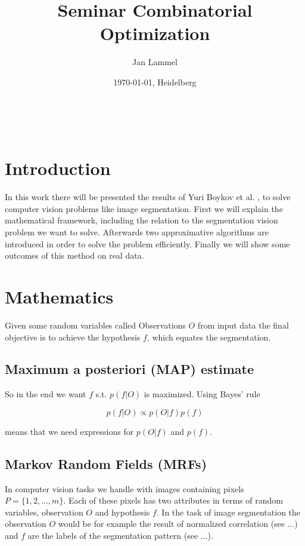 \documentclass{scrartcl}[12pt, halfparskip]
\title{Seminar Combinatorial Optimization}
\author{Jan Lammel}
\date{\today{}, Heidelberg}
\begin{document}
\maketitle \ \\ 
\newpage


\section{Introduction}
In this work there will be presented the results of Yuri Boykov et al. \cite{boykov98}, \cite{boykov01} to solve computer vision problems like image segmentation. First we will explain the mathematical framework, including the relation to the segmentation vision problem we want to solve. Afterwards two approximative algorithms are introduced in order to solve the problem efficiently. Finally we will show some outcomes of this method on real data.


\section{Mathematics}
Given some random variables called Observations $O$ from input data the final objective is to achieve the hypothesis $f$, which equates the segmentation.


\subsection{Maximum a posteriori (MAP) estimate}

So in the end we want $f$ s.t. $p(f|O)$ is maximized. Using Bayes' rule

\begin{equation}
	p(f|O) \propto p(O|f) p(f)
\end{equation}

means that we need expressions for $p(O|f)$ and $p(f)$.


\subsection{Markov Random Fields (MRFs)}
In computer vision tasks we handle with images containing pixels $P = \{ 1, 2, ..., m \}$. Each of these pixels has two attributes in terms of random variables, observation $O$ and hypothesis $f$. In the task of image segmentation the observation $O$ would be for example the result of normalized correlation (see ...) and $f$ are the labels of the segmentation pattern (see ...). \\
\end{document}
